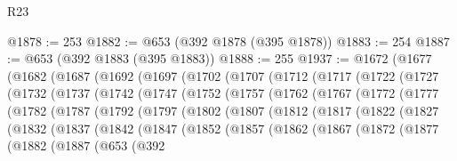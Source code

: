 \begin{lexlean}{R23}
\begin{coremodule}
@1878 := 253
@1882 := @653 (@392 @1878 (@395 @1878))
@1883 := 254
@1887 := @653 (@392 @1883 (@395 @1883))
@1888 := 255
@1937 := @1672
    (@1677
      (@1682
        (@1687
          (@1692
            (@1697
              (@1702
                (@1707
                  (@1712
                    (@1717
                      (@1722
                        (@1727
                          (@1732
                            (@1737
                              (@1742
                                (@1747
                                  (@1752
                                    (@1757
                                      (@1762
                                        (@1767
                                          (@1772
                                            (@1777
                                              (@1782
                                                (@1787
                                                  (@1792
                                                    (@1797
                                                      (@1802
                                                        (@1807
                                                          (@1812
                                                            (@1817
                                                              (@1822
                                                                (@1827
                                                                  (@1832
                                                                    (@1837
                                                                      (@1842
                                                                        (@1847
                                                                          (@1852
                                                                            (@1857
                                                                              (@1862
                                                                                (@1867
                                                                                  (@1872
                                                                                    (@1877
                                                                                      (@1882
                                                                                        (@1887
                                                                                          (@653
                                                                                            (@392

\end{coremodule}
\end{lexlean}
